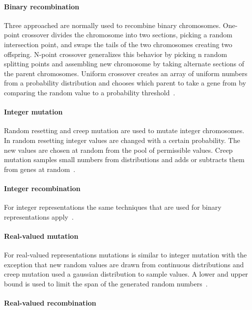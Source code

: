 \paragraph{Binary recombination}

Three approached are normally used to recombine binary chromosomes. One-point crossover divides the chromosome into two sections, picking a random intersection point, and swaps the tails of the two chromosomes creating two offspring. N-point crossover generalizes this behavior by picking n random splitting points and assembling new chromosome by taking alternate sections of the parent chromosomes. Uniform crossover creates an array of uniform numbers from a probability distribution and chooses which parent to take a gene from by comparing the random value to a probability threshold~\cite{Eiben201511}.

\paragraph{Integer mutation}

Random resetting and creep mutation are used to mutate integer chromosomes. In random resetting integer values are changed with a certain probability. The new values are chosen at random from the pool of permissible values. Creep mutation samples small numbers from distributions and adds or subtracts them from genes at random~\cite{Eiben201511}.

\paragraph{Integer recombination}

For integer representations the same techniques that are used for binary representations apply~\cite{Eiben201511}.


\paragraph{Real-valued mutation}

For real-valued representations mutations is similar to integer mutation with the exception that new random values are drawn from continuous distributions and creep mutation used a gaussian distribution to sample values. A lower and upper bound is used to limit the span of the generated random numbers~\cite{Eiben201511}.

\paragraph{Real-valued recombination}

